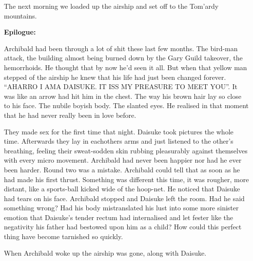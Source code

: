 The next morning we loaded up the airship and set off to the Tom’ardy mountains.\medskip

\textbf{Epilogue:}\medskip

Archibald had been through a lot of shit these last few months. The bird-man attack, the building almost being burned down by the Gary Guild takeover, the hemorrhoids. He thought that by now he’d seen it all. But when that yellow man stepped of the airship he knew that his life had just been changed forever. “AHARRO I AMA DAISUKE. IT ISS MY PREASURE TO MEET YOU”. It was like an arrow had hit him in the chest. The way his brown hair lay so close to his face. The nubile boyish body. The slanted eyes. He realised in that moment that he had never really been in love before.\medskip

They made sex for the first time that night. Daisuke took pictures the whole time. Afterwards they lay in eachothers arms and just listened to the other’s breathing, feeling their sweat-sodden skin rubbing pleasurably against themselves with every micro movement. Archibald had never been happier nor had he ever been harder. Round two was a mistake. Archibald could tell that as soon as he had made his first thrust. Something was different this time, it was rougher, more distant, like a sports-ball kicked wide of the hoop-net. He noticed that Daisuke had tears on his face. Archibald stopped and Daisuke left the room. Had he said something wrong? Had his body mistranslated his lust into some more sinister emotion that Daisuke’s tender rectum had internalised and let fester like the negativity his father had bestowed upon him as a child? How could this perfect thing have become tarnished so quickly.\medskip

When Archibald woke up the airship was gone, along with Daisuke.\medskip

\vspace*{5mm}

